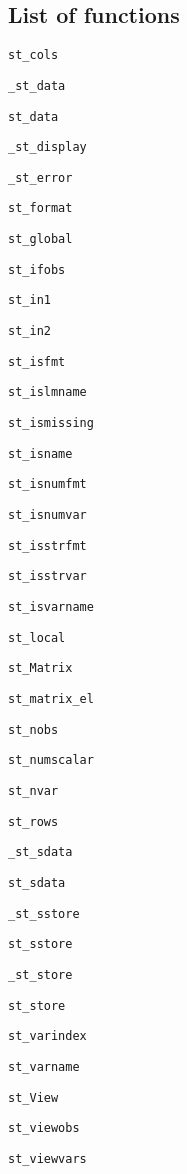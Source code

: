 \documentclass{article}
\begin{document}
\subsection{List of functions} \label{func_list}

\begin{multicols}{3}
\setcounter{finalcolumnbadness}{0}

\lstinline$st_cols$ 

\lstinline$_st_data$ 

\lstinline$st_data$ 

{\color{gray}\lstinline$_st_display$}

{\color{gray}\lstinline$_st_error$}

\lstinline$st_format$ 

\lstinline$st_global$ 

\lstinline$st_ifobs$ 

\lstinline$st_in1$ 

\lstinline$st_in2$ 

\lstinline$st_isfmt$ 

\lstinline$st_islmname$ 

\lstinline$st_ismissing$ 

\lstinline$st_isname$ 

\lstinline$st_isnumfmt$ 

\lstinline$st_isnumvar$ 

\lstinline$st_isstrfmt$ 

\lstinline$st_isstrvar$ 

\lstinline$st_isvarname$ 

\lstinline$st_local$ 

\lstinline$st_Matrix$ 

\lstinline$st_matrix_el$ 

\lstinline$st_nobs$ 

\lstinline$st_numscalar$ 

\lstinline$st_nvar$

\lstinline$st_rows$

\lstinline$_st_sdata$ 

\lstinline$st_sdata$

\lstinline$_st_sstore$

\lstinline$st_sstore$ 

\lstinline$_st_store$ 

\lstinline$st_store$ 

\lstinline$st_varindex$ 

\lstinline$st_varname$ 

\lstinline$st_View$ 

\lstinline$st_viewobs$ 

\lstinline$st_viewvars$
\end{multicols}
\end{document}
